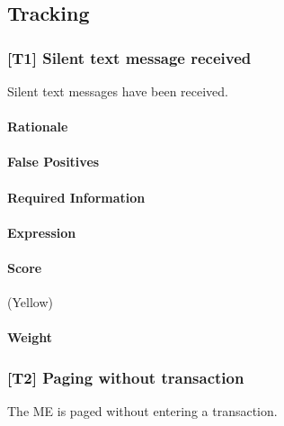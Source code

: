 \documentclass[a4paper,11pt,notitlepage,bigheadings,oneside]{scrartcl}
\begin{document}
\TBD{}

\subsection{Tracking}

\subsubsection{[T1] Silent text message received}

Silent text messages have been received.

\paragraph{Rationale}

\TBD{}

\paragraph{False Positives}


\paragraph{Required Information}

\TBD{}

\paragraph{Expression}

\TBD{}

\paragraph{Score}

\TBD{} (Yellow)

\paragraph{Weight}

\TBD{}

\subsubsection{[T2] Paging without transaction}

The ME is paged without entering a transaction.
\end{document}
